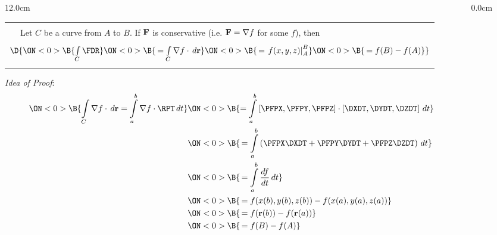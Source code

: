 \begin{frame}
\begin{columns}\begin{column}{12.0cm}

\scriptsize

\begin{center}
{\setlength{\extrarowheight}{-0.1cm}
\begin{tabular}{|p{0.4cm}p{10.6cm}|}
	\hline
	\hline
	&\\
	\THM & Let $C$ be a curve from $A$ to $B$.  If ${\bf F}$ is conservative (i.e. ${\bf F} = \nabla f$ for some $f$), then \\
	& \\
	\multicolumn{2}{|c|}{$\D{
	\ON<0>{\B{\int \limits_{C} \FDR }}
	\ON<0>{\B{\, = \int \limits_{C} \nabla f \cdot \, d{\bf r} }}
	\ON<0>{\B{\, = \left.f(x,y,z)\right|_A^B }}
	\ON<0>{\B{\, = f(B) - f(A)}}}$} \\
	&\\
	\hline
	\hline
\end{tabular}}
\end{center}
{\em Idea of Proof}:  
\begin{align*}
\ON<0>{\B{\int \limits_{C} \nabla f \cdot \, d{\bf r} = \int \limits_{a}^{b} \nabla f \cdot \RPT \, dt }} 
& \ON<0>{\B{= \int \limits_{a}^{b} \left[\PFPX,\PFPY,\PFPZ\right] \cdot \left[\DXDT,\DYDT,\DZDT\right] \, dt}} \\
& \ON<0>{\B{\, = \int \limits_{a}^{b} \left(\PFPX\DXDT + \PFPY\DYDT + \PFPZ\DZDT\right) \, dt}} \\
& \ON<0>{\B{\, = \int \limits_{a}^{b} \frac{df}{dt} \, dt}} \\
& \ON<0>{\B{\, = f(x(b),y(b),z(b)) - f(x(a),y(a),z(a))}} \\
& \ON<0>{\B{\, = f({\bf r}(b)) - f({\bf r}(a))}} \\
& \ON<0>{\B{\, = f(B) - f(A)}} \\
\end{align*}

\vspace{0.2cm}

\end{column}\begin{column}{0.0cm}\end{column}\end{columns}
\end{frame}

